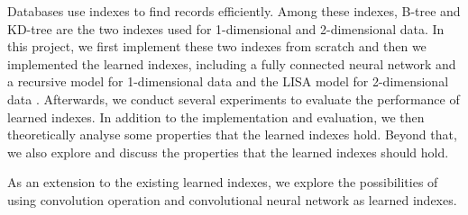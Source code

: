 Databases use indexes to find records efficiently. Among these indexes, B-tree and KD-tree are the two indexes used for 1-dimensional and 2-dimensional data. In this project, we first implement these two indexes from scratch and then we implemented the learned indexes, including a fully connected neural network and a recursive model for 1-dimensional data \cite{kraska2018case} and the LISA model for 2-dimensional data \cite{li2020lisa}. Afterwards, we conduct several experiments to evaluate the performance of learned indexes. In addition to the implementation and evaluation, we then theoretically analyse some properties that the learned indexes hold. Beyond that, we also explore and discuss the properties that the learned indexes should hold.

As an extension to the existing learned indexes, we explore the possibilities of using convolution operation and convolutional neural network as learned indexes.
